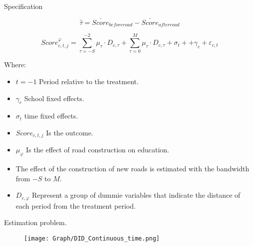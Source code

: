 \documentclass[9pt]{beamer}
\begin{document}
\begin{frame}{Specification}

\begin{equation} 
\hat{\tau} = \bar{Score}_{before road} - \bar{Score}_{after road}
\end{equation}

\begin{equation}  \label{eq:es1}
         Score_{c,t,j}^{\varphi} = %
         \sum^{-2}_{\tau =-S}  \mu_\tau  \cdot D_{c,\tau} +
         \sum^{M}_{\tau =0}  \mu_\tau  \cdot D_{c,\tau} +
         \sigma_t +  + \gamma_c +  \varepsilon_{c,t} 
\end{equation} 

Where:
 \small
 
\begin{itemize}
    \item $t=-1$ Period relative to the treatment.\\
    \item  $ \gamma_c $ School fixed effects.\\
    \item $\sigma_t$ time fixed effects.\\
    \item$Score_{c,t,j} $ Is the outcome.\\
    \item$\mu_\varphi$ Is the effect of road construction on education.\\
    \item The effect of the construction of new roads is estimated with the bandwidth from $-S$ to $M$.\\
    \item $D_{c,\varphi}$ Represent a group of dummie variables that indicate the distance of each period from the treatment period.
 
\end{itemize}

\end{frame}
\begin{frame}{Estimation problem.}
        \begin{figure}[H]
    \centering
        \renewcommand\thefigure{4.2}
    \texttt{[image: Graph/DID\_‎Continuous\_time.png]}  
     
\end{figure}
\end{frame}
\end{document}
